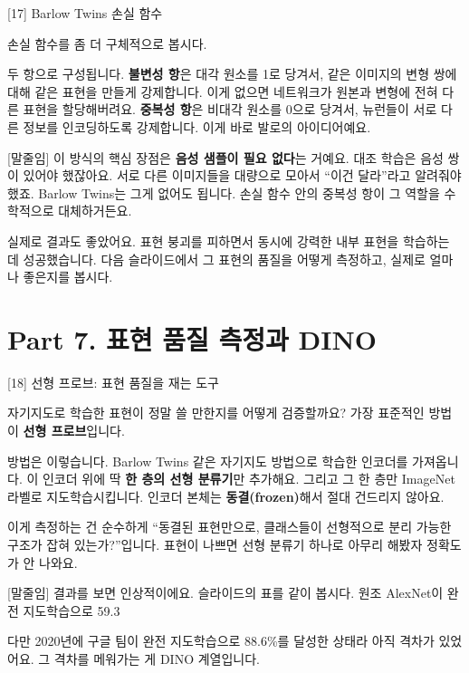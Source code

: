 \documentclass[aspectratio=169,10pt]{beamer}
\newenvironment{script}{%
  \footnotesize
  \setlength{\parskip}{0.5em}
  \setlength{\parindent}{0pt}
}{}
\begin{document}
\begin{frame}{[17] Barlow Twins 손실 함수}
\begin{script}
손실 함수를 좀 더 구체적으로 봅시다.

두 항으로 구성됩니다. \textbf{불변성 항}은 대각 원소를 1로 당겨서, 같은 이미지의 변형 쌍에 대해 같은 표현을 만들게 강제합니다. 이게 없으면 네트워크가 원본과 변형에 전혀 다른 표현을 할당해버려요. \textbf{중복성 항}은 비대각 원소를 0으로 당겨서, 뉴런들이 서로 다른 정보를 인코딩하도록 강제합니다. 이게 바로 발로의 아이디어예요.

[말줄임] 이 방식의 핵심 장점은 \textbf{음성 샘플이 필요 없다}는 거예요. 대조 학습은 음성 쌍이 있어야 했잖아요. 서로 다른 이미지들을 대량으로 모아서 ``이건 달라''라고 알려줘야 했죠. Barlow Twins는 그게 없어도 됩니다. 손실 함수 안의 중복성 항이 그 역할을 수학적으로 대체하거든요.

실제로 결과도 좋았어요. 표현 붕괴를 피하면서 동시에 강력한 내부 표현을 학습하는 데 성공했습니다. 다음 슬라이드에서 그 표현의 품질을 어떻게 측정하고, 실제로 얼마나 좋은지를 봅시다.
\end{script}
\end{frame}

\section{Part 7. 표현 품질 측정과 DINO}

\begin{frame}{[18] 선형 프로브: 표현 품질을 재는 도구}
\begin{script}
자기지도로 학습한 표현이 정말 쓸 만한지를 어떻게 검증할까요? 가장 표준적인 방법이 \textbf{선형 프로브}입니다.

방법은 이렇습니다. Barlow Twins 같은 자기지도 방법으로 학습한 인코더를 가져옵니다. 이 인코더 위에 딱 \textbf{한 층의 선형 분류기}만 추가해요. 그리고 그 한 층만 ImageNet 라벨로 지도학습시킵니다. 인코더 본체는 \textbf{동결(frozen)}해서 절대 건드리지 않아요.

이게 측정하는 건 순수하게 ``동결된 표현만으로, 클래스들이 선형적으로 분리 가능한 구조가 잡혀 있는가?''입니다. 표현이 나쁘면 선형 분류기 하나로 아무리 해봤자 정확도가 안 나와요.

[말줄임] 결과를 보면 인상적이에요. 슬라이드의 표를 같이 봅시다. 원조 AlexNet이 완전 지도학습으로 59.3%

다만 2020년에 구글 팀이 완전 지도학습으로 88.6\%를 달성한 상태라 아직 격차가 있었어요. 그 격차를 메워가는 게 DINO 계열입니다.
\end{script}
\end{frame}
\end{document}
